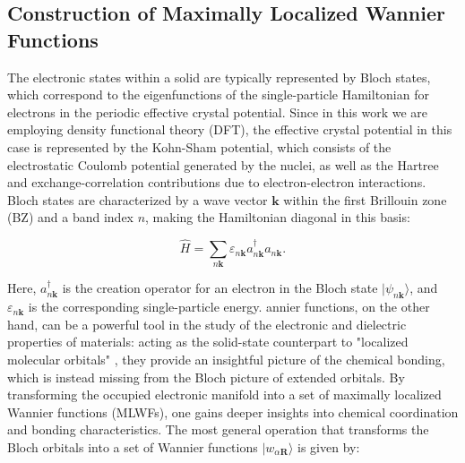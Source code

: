\documentclass[%
 reprint,
 amsmath,amssymb,
 aps,
]{revtex4-2}
\begin{document}
\subsection{Construction of Maximally Localized Wannier Functions}
The electronic states within a solid are typically represented by Bloch states, which correspond to the eigenfunctions of the single-particle Hamiltonian for electrons in the periodic effective crystal potential. Since in this work we are employing density functional theory (DFT), the effective crystal potential in this case is represented by the Kohn-Sham potential, which consists of the electrostatic Coulomb potential generated by the nuclei, as well as the Hartree and exchange-correlation contributions due to electron-electron interactions. Bloch states are characterized by a wave vector \(\mathbf{k}\) within the first Brillouin zone (BZ) and a band index \(n\), making the Hamiltonian diagonal in this basis:

\begin{equation}
    \hat{H} = \sum_{n\mathbf{k}} \varepsilon_{n\mathbf{k}} a^{\dagger}_{n\mathbf{k}} a_{n\mathbf{k}}.
\end{equation}

Here, \( a^{\dagger}_{n\mathbf{k}} \) is the creation operator for an electron in the Bloch state \( |\psi_{n\mathbf{k}}\rangle \), and \( \varepsilon_{n\mathbf{k}} \) is the corresponding single-particle energy.
annier functions, on the other hand, can be a powerful tool in the study of the electronic and dielectric properties of materials: acting as the solid-state counterpart to "localized molecular orbitals" \cite{Boys1966}, they provide an insightful picture of the chemical bonding, which is instead missing from the Bloch picture of extended orbitals. By transforming the occupied electronic manifold into a set of maximally localized Wannier functions (MLWFs), one gains deeper insights into chemical coordination and bonding characteristics. The most general operation that transforms the Bloch orbitals into a set of Wannier functions  \( |w_{\alpha \mathbf{R}}\rangle \) is given by:
\end{document}
